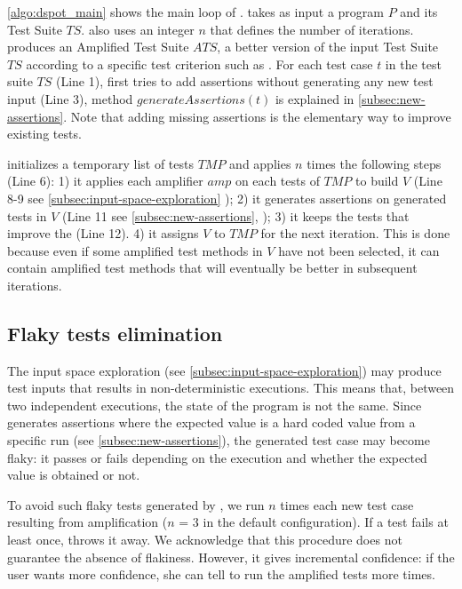 \autoref{algo:dspot_main} shows the main loop of \dspot. 
\dspot takes as input a program $P$ and its Test Suite $TS$. \dspot also uses an integer $n$ that defines the number of iterations.
\dspot produces an Amplified Test Suite $ATS$, \ie a better version of the input Test Suite $TS$ according to a specific test criterion such as \ms.
For each test case $t$ in the test suite $TS$ (Line 1), \dspot first tries to add assertions without generating any new test input (Line 3),  method $generateAssertions\left(t\right)$ is explained in \autoref{subsec:new-assertions}.
Note that adding missing assertions is the elementary way to improve existing tests.

\dspot initializes a temporary list of tests $TMP$ and applies $n$ times the following steps (Line 6): 
1) it applies each amplifier $amp$ on each tests of $TMP$ to build $V$ (Line 8-9 see \autoref{subsec:input-space-exploration} \ie \Iampl);
2) it generates assertions on generated tests in $V$ (Line 11 see \autoref{subsec:new-assertions}, \ie \Aampl);
3) it keeps the tests that improve the \ms (Line 12).
4) it assigns $V$ to $TMP$ for the next iteration. This is done because even if some amplified test methods in $V$ have not been selected, it can contain amplified test methods that will eventually be better in subsequent iterations.


\subsection{Flaky tests elimination}
The input space exploration (see \autoref{subsec:input-space-exploration}) may produce test inputs that results in non-deterministic executions.
This means that, between two independent executions, the state of the program is not the same.
Since \dspot generates assertions where the expected value is a hard coded value from a specific run (see \autoref{subsec:new-assertions}), the generated test case may become flaky: it passes or fails depending on the execution and whether the expected value is obtained or not.

To avoid such flaky tests generated by \dspot, we run $n$ times each new test case resulting from amplification ($n$ = 3 in the default configuration). 
If a test fails at least once, \dspot throws it away. 
We acknowledge that this procedure does not guarantee the absence of flakiness. 
However, it gives incremental confidence: if the user wants more confidence, she can tell \dspot to run the amplified tests more times.

